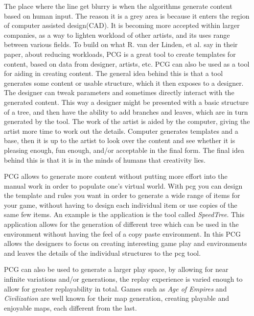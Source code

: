 The place where the line get blurry is when the algorithms generate content based on human input. The reason it is a grey area is because it enters the region of computer assisted design(CAD)\cite{book:cad}.
It is becoming more accepted within larger companies, as a way to lighten workload of other artists, and its uses range between various fields.
To build on what R. van der Linden, et al. say in their paper, about reducing workloads, PCG is a great tool to create templates for content, based on data from designer, artists, etc. PCG can also be used as a tool for aiding in creating content.  
The general idea behind this is that a tool generates some content or usable structure, which it then exposes to a designer. The designer can tweak parameters and sometimes directly interact with the generated content. This way a designer might be presented with a basic structure of a tree, and then have the ability to add branches and leaves, which are in turn generated by the tool. 
The work of the artist is aided by the computer, giving the artist more time to work out the details. Computer generates templates and a base, then it is up to the artist to look over the content and see whether it is pleasing enough, fun enough, and/or acceptable in the final form. The final idea behind this is that it is in the minds of humans that creativity lies. 

PCG allows to generate more content without putting more effort into the manual work in order to populate one's virtual world. With pcg you can design the template and rules you want in order to generate a wide range of items for your game, without having to design each individual item or use copies of the same few items. An example is the application is the tool called \textit{SpeedTree}. This application allows for the generation of different tree which can be used in the environment without having the feel of a copy paste environment. In this PCG allows the designers to focus on creating interesting game play and environments and leaves the details of the individual structures to the pcg tool. 

PCG can also be used to generate a larger play space, by allowing for near infinite variations and/or generations, the replay experience is varied enough to allow for greater replayability in total. Games such as \textit{Age of Empires} and \textit{Civilization} are well known for their map generation, creating playable and enjoyable maps, each different from the last.


